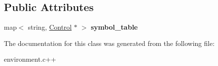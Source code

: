 \subsection*{Public Attributes}
\begin{DoxyCompactItemize}
\item 
\hypertarget{classEnvironment_ae86ce99694878510782a516082bdad0f}{
map$<$ string, \hyperlink{classControl}{Control} $\ast$ $>$ {\bfseries symbol\_\-table}}
\label{classEnvironment_ae86ce99694878510782a516082bdad0f}

\end{DoxyCompactItemize}


The documentation for this class was generated from the following file:\begin{DoxyCompactItemize}
\item 
environment.c++\end{DoxyCompactItemize}
